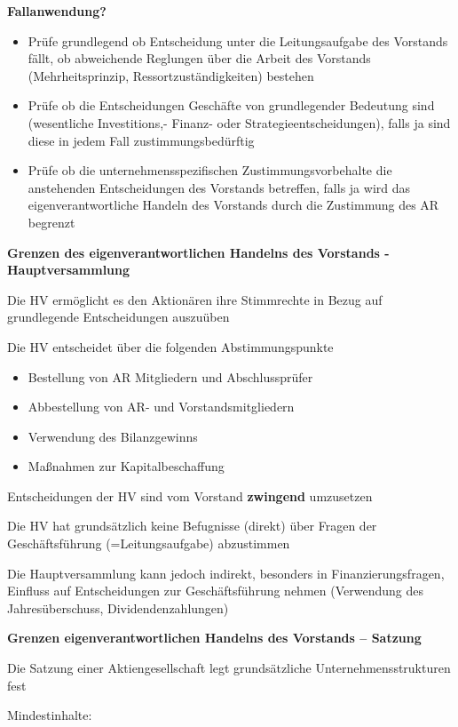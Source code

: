 \documentclass[
]{article}
\providecommand{\tightlist}{%
  \setlength{\itemsep}{0pt}\setlength{\parskip}{0pt}}
\begin{document}
\textbf{Fallanwendung?}

\begin{itemize}
\tightlist
\item
  Prüfe grundlegend ob Entscheidung unter die Leitungsaufgabe des
  Vorstands fällt, ob abweichende Reglungen über die Arbeit des
  Vorstands (Mehrheitsprinzip, Ressortzuständigkeiten) bestehen
\item
  Prüfe ob die Entscheidungen Geschäfte von grundlegender Bedeutung sind
  (wesentliche Investitions,- Finanz- oder Strategieentscheidungen),
  falls ja sind diese in jedem Fall zustimmungsbedürftig
\item
  Prüfe ob die unternehmensspezifischen Zustimmungsvorbehalte die
  anstehenden Entscheidungen des Vorstands betreffen, falls ja wird das
  eigenverantwortliche Handeln des Vorstands durch die Zustimmung des AR
  begrenzt
\end{itemize}

\textbf{Grenzen des eigenverantwortlichen Handelns des Vorstands -
Hauptversammlung}

Die HV ermöglicht es den Aktionären ihre Stimmrechte in Bezug auf
grundlegende Entscheidungen auszuüben

Die HV entscheidet über die folgenden Abstimmungspunkte

\begin{itemize}
\tightlist
\item
  Bestellung von AR Mitgliedern und Abschlussprüfer
\item
  Abbestellung von AR- und Vorstandsmitgliedern
\item
  Verwendung des Bilanzgewinns
\item
  Maßnahmen zur Kapitalbeschaffung
\end{itemize}

Entscheidungen der HV sind vom Vorstand \textbf{zwingend} umzusetzen

Die HV hat grundsätzlich keine Befugnisse (direkt) über Fragen der
Geschäftsführung (=Leitungsaufgabe) abzustimmen

Die Hauptversammlung kann jedoch indirekt, besonders in
Finanzierungsfragen, Einfluss auf Entscheidungen zur Geschäftsführung
nehmen (Verwendung des Jahresüberschuss, Dividendenzahlungen)

\textbf{Grenzen eigenverantwortlichen Handelns des Vorstands -- Satzung}

Die Satzung einer Aktiengesellschaft legt grundsätzliche
Unternehmensstrukturen fest

Mindestinhalte:
\end{document}
